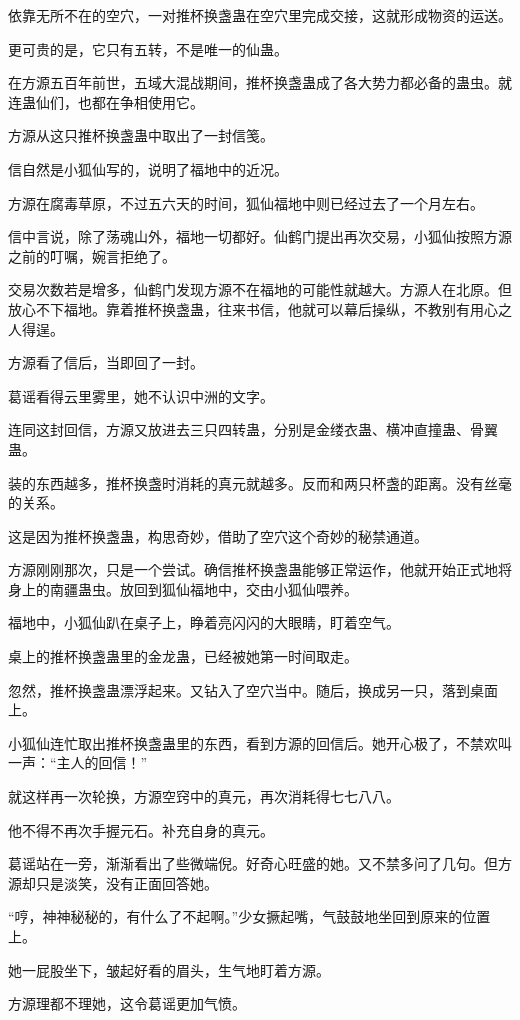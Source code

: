 \begin{this_body}
依靠无所不在的空穴，一对推杯换盏蛊在空穴里完成交接，这就形成物资的运送。

更可贵的是，它只有五转，不是唯一的仙蛊。

在方源五百年前世，五域大混战期间，推杯换盏蛊成了各大势力都必备的蛊虫。就连蛊仙们，也都在争相使用它。

方源从这只推杯换盏蛊中取出了一封信笺。

信自然是小狐仙写的，说明了福地中的近况。

方源在腐毒草原，不过五六天的时间，狐仙福地中则已经过去了一个月左右。

信中言说，除了荡魂山外，福地一切都好。仙鹤门提出再次交易，小狐仙按照方源之前的叮嘱，婉言拒绝了。

交易次数若是增多，仙鹤门发现方源不在福地的可能性就越大。方源人在北原。但放心不下福地。靠着推杯换盏蛊，往来书信，他就可以幕后操纵，不教别有用心之人得逞。

方源看了信后，当即回了一封。

葛谣看得云里雾里，她不认识中洲的文字。

连同这封回信，方源又放进去三只四转蛊，分别是金缕衣蛊、横冲直撞蛊、骨翼蛊。

装的东西越多，推杯换盏时消耗的真元就越多。反而和两只杯盏的距离。没有丝毫的关系。

这是因为推杯换盏蛊，构思奇妙，借助了空穴这个奇妙的秘禁通道。

方源刚刚那次，只是一个尝试。确信推杯换盏蛊能够正常运作，他就开始正式地将身上的南疆蛊虫。放回到狐仙福地中，交由小狐仙喂养。

福地中，小狐仙趴在桌子上，睁着亮闪闪的大眼睛，盯着空气。

桌上的推杯换盏蛊里的金龙蛊，已经被她第一时间取走。

忽然，推杯换盏蛊漂浮起来。又钻入了空穴当中。随后，换成另一只，落到桌面上。

小狐仙连忙取出推杯换盏蛊里的东西，看到方源的回信后。她开心极了，不禁欢叫一声：“主人的回信！”

就这样再一次轮换，方源空窍中的真元，再次消耗得七七八八。

他不得不再次手握元石。补充自身的真元。

葛谣站在一旁，渐渐看出了些微端倪。好奇心旺盛的她。又不禁多问了几句。但方源却只是淡笑，没有正面回答她。

“哼，神神秘秘的，有什么了不起啊。”少女撅起嘴，气鼓鼓地坐回到原来的位置上。

她一屁股坐下，皱起好看的眉头，生气地盯着方源。

方源理都不理她，这令葛谣更加气愤。


\end{this_body}
